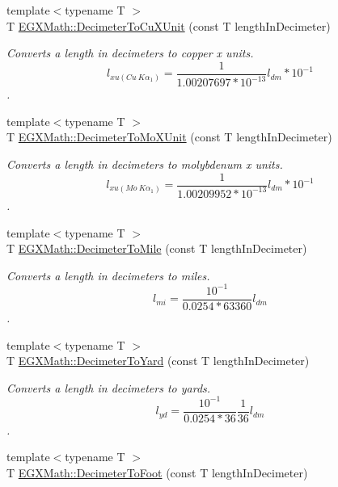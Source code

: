 \begin{DoxyCompactItemize}
{\footnotesize template$<$typename T $>$ }\\T \mbox{\hyperlink{group___e_g_x_math-_conversions-_length_conversions-_s_i-_decimeter-_non-_s_i_gab595b2398e8e838922b4591308466e87}{E\+G\+X\+Math\+::\+Decimeter\+To\+Cu\+X\+Unit}} (const T length\+In\+Decimeter)
\begin{DoxyCompactList}\small\item\em Converts a length in decimeters to copper x units. \[ l_{xu(Cu\ K\alpha_1)}= \frac{1}{1.00207697*10^{-13}} l_{dm} * 10^{-1}\]. \end{DoxyCompactList}\item 
{\footnotesize template$<$typename T $>$ }\\T \mbox{\hyperlink{group___e_g_x_math-_conversions-_length_conversions-_s_i-_decimeter-_non-_s_i_ga609f53e09c9a767639da3ad72905bb71}{E\+G\+X\+Math\+::\+Decimeter\+To\+Mo\+X\+Unit}} (const T length\+In\+Decimeter)
\begin{DoxyCompactList}\small\item\em Converts a length in decimeters to molybdenum x units. \[ l_{xu(Mo\ K\alpha_1)}=\frac{1}{1.00209952*10^{-13}} l_{dm} * 10^{-1}\]. \end{DoxyCompactList}\item 
{\footnotesize template$<$typename T $>$ }\\T \mbox{\hyperlink{group___e_g_x_math-_conversions-_length_conversions-_s_i-_decimeter-_imperial_gab7d9d207fb6aa53999300baf5d9cea16}{E\+G\+X\+Math\+::\+Decimeter\+To\+Mile}} (const T length\+In\+Decimeter)
\begin{DoxyCompactList}\small\item\em Converts a length in decimeters to miles. \[ l_{mi}=\frac{10^{-1}}{0.0254 * 63360} l_{dm} \]. \end{DoxyCompactList}\item 
{\footnotesize template$<$typename T $>$ }\\T \mbox{\hyperlink{group___e_g_x_math-_conversions-_length_conversions-_s_i-_decimeter-_imperial_ga2ffbd73da0cc3cbb36822127433e3267}{E\+G\+X\+Math\+::\+Decimeter\+To\+Yard}} (const T length\+In\+Decimeter)
\begin{DoxyCompactList}\small\item\em Converts a length in decimeters to yards. \[ l_{yd}= \frac{10^{-1}}{0.0254 * 36} \frac{1}{36} l_{dm} \]. \end{DoxyCompactList}\item 
{\footnotesize template$<$typename T $>$ }\\T \mbox{\hyperlink{group___e_g_x_math-_conversions-_length_conversions-_s_i-_decimeter-_imperial_gaf86c80f8ce1e5ab6113a2a912c1f446e}{E\+G\+X\+Math\+::\+Decimeter\+To\+Foot}} (const T length\+In\+Decimeter)

\end{DoxyCompactItemize}

